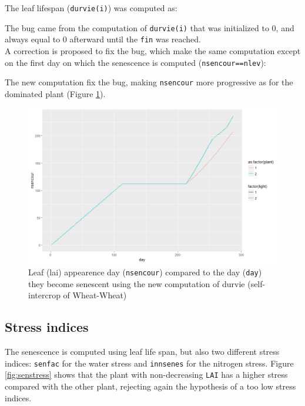 \documentclass[
]{book}
\begin{document}
The leaf lifespan (\texttt{durvie(i)}) was computed as:

The bug came from the computation of \texttt{durvie(i)} that was initialized to 0, and always equal to 0 afterward until the \texttt{fin} was reached.\\
A correction is proposed to fix the bug, which make the same computation except on the first day on which the senescence is computed (\texttt{nsencour==nlev}):

The new computation fix the bug, making \texttt{nsencour} more progressive as for the dominated plant (Figure \ref{fig:nsencourfix}).

\begin{figure}
\centering
\includegraphics{img/LAIhigh_nsencourfix.png}
\caption{\label{fig:nsencourfix}Leaf (lai) appearence day (\texttt{nsencour}) compared to the day (\texttt{day}) they become senescent using the new computation of durvie (self-intercrop of Wheat-Wheat)}
\end{figure}

\hypertarget{stress-indices}{%
\subsection{Stress indices}\label{stress-indices}}

The senescence is computed using leaf life span, but also two different stress indices: \texttt{senfac} for the water stress and \texttt{innsenes} for the nitrogen stress.
Figure \ref{fig:senstress} shows that the plant with non-decreasing \texttt{LAI} has a higher stress compared with the other plant, rejecting again the hypothesis of a too low stress indices.
\end{document}
